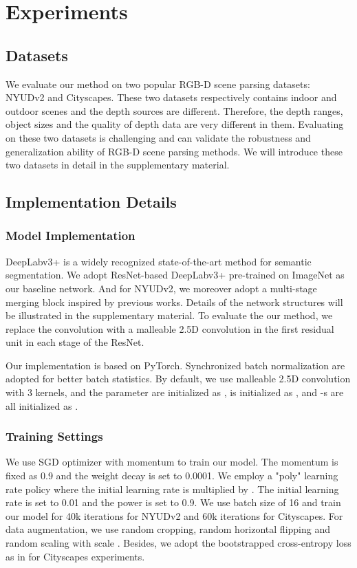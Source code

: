 \documentclass[runningheads]{llncs}
\begin{document}
\section{Experiments}
\subsection{Datasets}
We evaluate our method on two popular RGB-D scene parsing datasets: NYUDv2\cite{NYUDv2} and Cityscapes\cite{Cityscapes}.
These two datasets respectively contains indoor and outdoor scenes and the depth sources are different.
Therefore, the depth ranges, object sizes and the quality of depth data are very different in them.
Evaluating on these two datasets is challenging and can validate the robustness and generalization ability of RGB-D scene parsing methods.
We will introduce these two datasets in detail in the supplementary material.



\subsection{Implementation Details}
\subsubsection{Model Implementation}
DeepLabv3+\cite{DeepLabv3plus} is a widely recognized state-of-the-art method for semantic segmentation.
We adopt ResNet-based DeepLabv3+ pre-trained on ImageNet\cite{ImageNet} as our baseline network.
And for NYUDv2, we moreover adopt a multi-stage merging block inspired by previous works\cite{RefineNet,RDFNet}.
Details of the network structures will be illustrated in the supplementary material.
To evaluate the our method, we replace the  convolution with a malleable 2.5D convolution in the first residual unit in each stage of the ResNet.

Our implementation is based on PyTorch\cite{PyTorch}.
Synchronized batch normalization are adopted for better batch statistics.
By default, we use malleable 2.5D convolution with 3 kernels, and the parameter  are initialized as ,  is initialized as , and -s are all initialized as .

\subsubsection{Training Settings}
We use SGD optimizer with momentum to train our model. The momentum is fixed as 0.9 and the weight decay is set to 0.0001. We employ a "poly" learning rate policy where the initial learning rate is multiplied by . The initial learning rate is set to 0.01 and the power is set to 0.9.
We use batch size of 16 and train our model for 40k iterations for NYUDv2 and 60k iterations for Cityscapes.
For data augmentation, we use random cropping, random horizontal flipping and random scaling with scale .
Besides, we adopt the bootstrapped cross-entropy loss as in \cite{arxiv2016-WuSH16a} for Cityscapes experiments.
\end{document}
